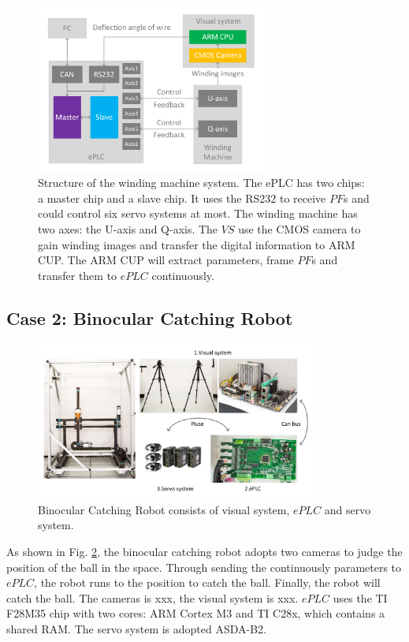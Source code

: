 \documentclass[journal,UTF8]{IEEEtran}
\begin{document}
\begin{figure}
	\centering
	\includegraphics[width=3in]{fig/WindingSystem.pdf}
	\caption{ Structure of the winding machine system. The ePLC has two chips: a master chip and a slave chip. It uses the RS232 to receive $PF$s and could control six servo systems at most. The winding machine has two axes: the U-axis and Q-axis. The $VS$ use the CMOS camera to gain winding images and transfer the digital information to ARM CUP. The ARM CUP will extract parameters, frame $PF$s and transfer them to $ePLC$ continuously.}
	\label{fig:WindingSystem}
\end{figure}
\subsection{Case 2: Binocular Catching Robot}
\begin{figure}
	\centering
	\includegraphics[width=3.7in]{fig/robot.pdf}
	\caption{ Binocular Catching Robot consists of visual system, $ePLC$ and servo system.}
	\label{fig:robot}
\end{figure}
As shown in Fig. \ref{fig:robot}, the binocular catching robot adopts two cameras to judge the position of the ball in the space. Through sending the continuously parameters to $ePLC$, the robot runs to the position to catch the ball. Finally, the robot will catch the ball. The cameras is xxx, the visual system is xxx. $ePLC$ uses the TI F28M35 chip with two cores: ARM Cortex M3 and TI C28x, which contains a shared RAM. The servo system is adopted ASDA-B2. 
\end{document}
